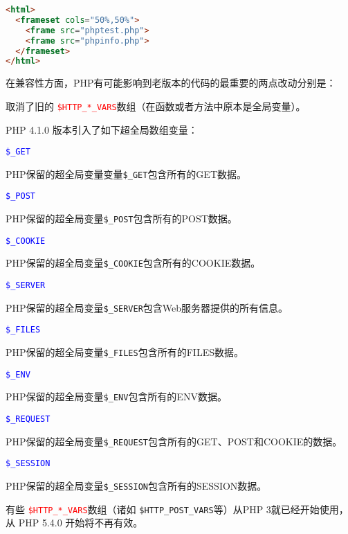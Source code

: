 \begin{lstlisting}[language=HTML]
<html>
  <frameset cols="50%,50%">
    <frame src="phptest.php">
    <frame src="phpinfo.php">
  </frameset>
</html>
\end{lstlisting}

在兼容性方面，PHP有可能影响到老版本的代码的最重要的两点改动分别是：

\begin{compactitem}
\item 取消了旧的 \textcolor{red}{\texttt{\$HTTP\_*\_VARS}}数组（在函数或者方法中原本是全局变量）。

\end{compactitem}

PHP 4.1.0 版本引入了如下超全局数组变量：

\begin{compactitem}
\item \textcolor{blue}{\texttt{\$\_GET}}

PHP保留的超全局变量变量\texttt{\$\_GET}包含所有的GET数据。
\item \textcolor{blue}{\texttt{\$\_POST}}

PHP保留的超全局变量\texttt{\$\_POST}包含所有的POST数据。
\item \textcolor{blue}{\texttt{\$\_COOKIE}}

PHP保留的超全局变量\texttt{\$\_COOKIE}包含所有的COOKIE数据。
\item \textcolor{blue}{\texttt{\$\_SERVER}}

PHP保留的超全局变量\texttt{\$\_SERVER}包含Web服务器提供的所有信息。

\item \textcolor{blue}{\texttt{\$\_FILES}}

PHP保留的超全局变量\texttt{\$\_FILES}包含所有的FILES数据。
\item \textcolor{blue}{\texttt{\$\_ENV}}

PHP保留的超全局变量\texttt{\$\_ENV}包含所有的ENV数据。
\item \textcolor{blue}{\texttt{\$\_REQUEST}}

PHP保留的超全局变量\texttt{\$\_REQUEST}包含所有的GET、POST和COOKIE的数据。
\item \textcolor{blue}{\texttt{\$\_SESSION}}

PHP保留的超全局变量\texttt{\$\_SESSION}包含所有的SESSION数据。
\end{compactitem}

有些 \textcolor{red}{\texttt{\$HTTP\_*\_VARS}}数组（诸如 \texttt{\$HTTP\_POST\_VARS}等）从PHP 3就已经开始使用，从 PHP 5.4.0 开始将不再有效。


